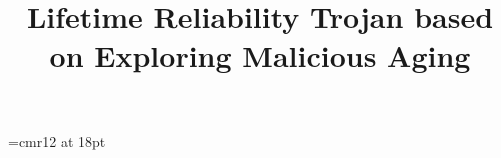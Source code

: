 \documentclass[9pt, conference]{IEEEtran}
\theoremstyle{mystyle}
\begin{document}
\font\myfont=cmr12 at 18pt
\title{\huge Lifetime Reliability Trojan based on Exploring Malicious Aging}



\begin{comment}
\author{\IEEEauthorblockN{Tien-Hung Tseng, Shou-Chun Li and Kai-Chiang Wu}
	\IEEEauthorblockA{Department of Computer Science\\
	National Chiao Tung University, Hsinchu, Taiwan \\
	E-mail: \{eric830303.cs05g@g2.nctu.edu.tw, scli.cs02g@nctu.edu.tw and kcw@cs.nctu.edu.tw\}}
}
\end{comment}



\maketitle




%



%
%



\IEEEpeerreviewmaketitle



\printbibliography




\end{document}
